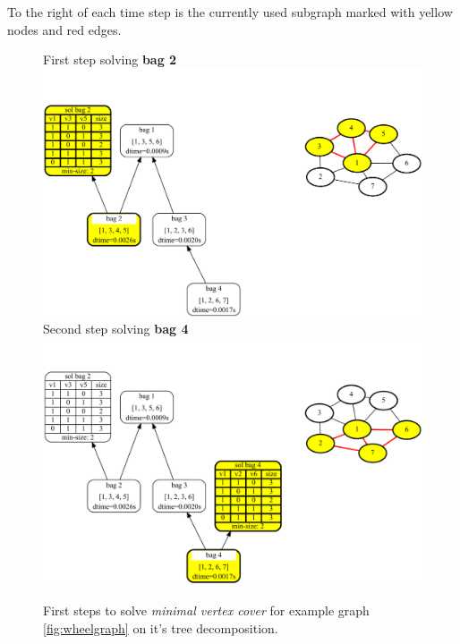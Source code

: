 \documentclass[a4paper, 12pt, bibliography=totoc]{scrartcl}
\begin{document}
To the right of each time step is the currently used subgraph marked with yellow nodes and red edges.


\begin{figure}[H]
	\centering
		First step solving \textbf{bag 2}
	\includegraphics[width=0.9\linewidth]{images/WheelGraph7/combined2.pdf} \vspace{1em}\\
	Second step solving \textbf{bag 4}\\
	
		\includegraphics[width=0.9\linewidth]{images/WheelGraph7/combined3.pdf}
	\caption{First steps to solve \textit{minimal vertex cover} for example graph \ref{fig:wheelgraph} on it's tree decomposition.}
	\label{fig:wheelgraphc23}
\end{figure}
\end{document}
